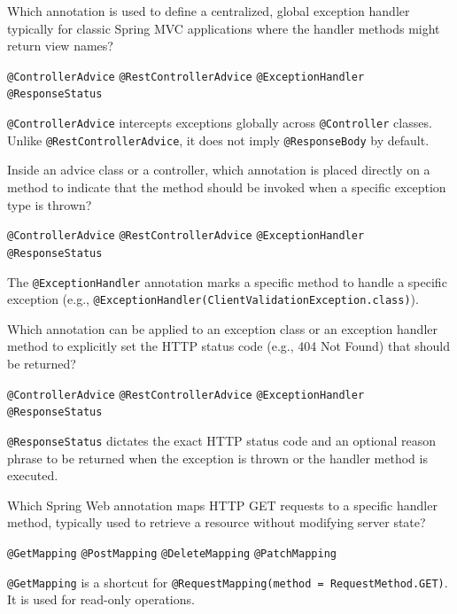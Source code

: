 \question[4]
Which annotation is used to define a centralized, global exception handler typically for classic Spring MVC applications where the handler methods might return view names?
\begin{choices}
  \CorrectChoice \texttt{@ControllerAdvice}
  \choice \texttt{@RestControllerAdvice}
  \choice \texttt{@ExceptionHandler}
  \choice \texttt{@ResponseStatus}
\end{choices}
\begin{solution}
  \texttt{@ControllerAdvice} intercepts exceptions globally across \texttt{@Controller} classes. Unlike \texttt{@RestControllerAdvice}, it does not imply \texttt{@ResponseBody} by default.
\end{solution}

\question[4]
Inside an advice class or a controller, which annotation is placed directly on a method to indicate that the method should be invoked when a specific exception type is thrown?
\begin{choices}
  \choice \texttt{@ControllerAdvice}
  \choice \texttt{@RestControllerAdvice}
  \CorrectChoice \texttt{@ExceptionHandler}
  \choice \texttt{@ResponseStatus}
\end{choices}
\begin{solution}
  The \texttt{@ExceptionHandler} annotation marks a specific method to handle a specific exception (e.g., \texttt{@ExceptionHandler(ClientValidationException.class)}).
\end{solution}

\question[4]
Which annotation can be applied to an exception class or an exception handler method to explicitly set the HTTP status code (e.g., 404 Not Found) that should be returned?
\begin{choices}
  \choice \texttt{@ControllerAdvice}
  \choice \texttt{@RestControllerAdvice}
  \choice \texttt{@ExceptionHandler}
  \CorrectChoice \texttt{@ResponseStatus}
\end{choices}
\begin{solution}
  \texttt{@ResponseStatus} dictates the exact HTTP status code and an optional reason phrase to be returned when the exception is thrown or the handler method is executed.
\end{solution}


\question[4]
Which Spring Web annotation maps HTTP GET requests to a specific handler method, typically used to retrieve a resource without modifying server state?
\begin{choices}
  \CorrectChoice \texttt{@GetMapping}
  \choice \texttt{@PostMapping}
  \choice \texttt{@DeleteMapping}
  \choice \texttt{@PatchMapping}
\end{choices}
\begin{solution}
  \texttt{@GetMapping} is a shortcut for \texttt{@RequestMapping(method = RequestMethod.GET)}. It is used for read-only operations.
\end{solution}

